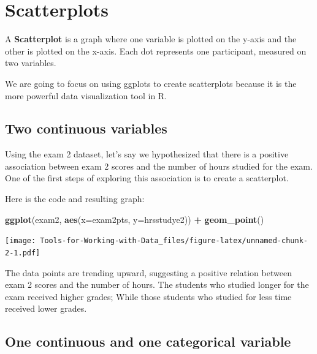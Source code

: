 \documentclass[
]{book}
\newenvironment{Shaded}{\begin{snugshade}}{\end{snugshade}}
\newcommand{\DataTypeTok}[1]{\textcolor[rgb]{0.13,0.29,0.53}{#1}}
\newcommand{\KeywordTok}[1]{\textcolor[rgb]{0.13,0.29,0.53}{\textbf{#1}}}
\newcommand{\NormalTok}[1]{#1}
\newcommand{\OperatorTok}[1]{\textcolor[rgb]{0.81,0.36,0.00}{\textbf{#1}}}
\newcommand{\StringTok}[1]{\textcolor[rgb]{0.31,0.60,0.02}{#1}}
\begin{document}
\hypertarget{scatterplots}{%
\section{Scatterplots}\label{scatterplots}}

A \textbf{Scatterplot} is a graph where one variable is plotted on the y-axis and the other is plotted on the x-axis. Each dot represents one participant, measured on two variables.

We are going to focus on using ggplots to create scatterplots because it is the more powerful data visualization tool in R.

\hypertarget{two-continuous-variables}{%
\subsection{Two continuous variables}\label{two-continuous-variables}}

Using the exam 2 dataset, let's say we hypothesized that there is a positive association between exam 2 scores and the number of hours studied for the exam. One of the first steps of exploring this association is to create a scatterplot.

Here is the code and resulting graph:

\begin{Shaded}
\begin{Highlighting}[]
\KeywordTok{ggplot}\NormalTok{(exam2, }\KeywordTok{aes}\NormalTok{(}\DataTypeTok{x=}\NormalTok{exam2pts, }\DataTypeTok{y=}\NormalTok{hrsstudye2)) }\OperatorTok{+}
\StringTok{  }\KeywordTok{geom_point}\NormalTok{()}
\end{Highlighting}
\end{Shaded}

\texttt{[image: Tools-for-Working-with-Data\_files/figure-latex/unnamed-chunk-2-1.pdf]}

The data points are trending upward, suggesting a positive relation between exam 2 scores and the number of hours. The students who studied longer for the exam received higher grades; While those students who studied for less time received lower grades.

\hypertarget{one-continuous-and-one-categorical-variable}{%
\subsection{One continuous and one categorical variable}\label{one-continuous-and-one-categorical-variable}}
\end{document}
